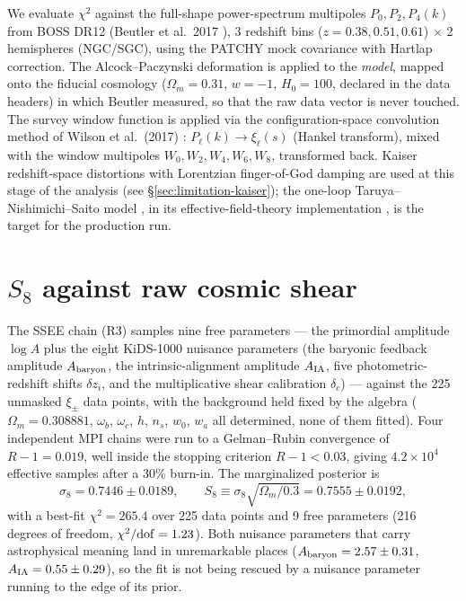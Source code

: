 \documentclass[12pt,a4paper]{article}
\newcommand{\SSEE}{\textsc{SSEE}}
\begin{document}
We evaluate $\chi^2$ against the full-shape power-spectrum multipoles
$P_0,P_2,P_4(k)$ from BOSS DR12 (Beutler et al.~2017 \citep{Beutler2017}), 3 redshift bins
($z=0.38,0.51,0.61$) $\times$ 2 hemispheres (NGC/SGC), using the PATCHY mock
covariance with Hartlap correction. The Alcock--Paczynski deformation is
applied to the \emph{model}, mapped onto the fiducial cosmology
($\Omega_m=0.31$, $w=-1$, $H_0=100$, declared in the data headers) in which
Beutler measured, so that the raw data vector is never touched. The survey
window function is applied via the configuration-space convolution method of
Wilson et al.~(2017) \citep{Wilson2017}: $P_\ell(k)\to\xi_\ell(s)$ (Hankel transform),
mixed with the window multipoles $W_0,W_2,W_4,W_6,W_8$, transformed back.
Kaiser redshift-space distortions with Lorentzian finger-of-God damping are
used at this stage of the analysis (see \S\ref{sec:limitation-kaiser}); the
one-loop Taruya--Nishimichi--Saito model \citep{Taruya2010}, in its
effective-field-theory implementation \citep{Baumann2012,ChenVlahWhite2020},
is the target for the production run.

\section{$S_8$ against raw cosmic shear}
\label{sec:s8}

The \SSEE{} chain (R3) samples nine free parameters --- the primordial
amplitude $\log A$ plus the eight KiDS-1000 nuisance parameters (the baryonic
feedback amplitude $A_{\rm baryon}$, the intrinsic-alignment amplitude
$A_{\rm IA}$, five photometric-redshift shifts $\delta z_i$, and the
multiplicative shear calibration $\delta_c$) --- against the 225 unmasked
$\xi_\pm$ data points, with the background held fixed by the algebra
($\Omega_m=0.308881$, $\omega_b$, $\omega_c$, $h$, $n_s$, $w_0$, $w_a$ all
determined, none of them fitted). Four independent MPI chains were run to a
Gelman--Rubin convergence of $R-1=0.019$, well inside the stopping criterion
$R-1<0.03$, giving $4.2\times10^4$ effective samples after a 30\% burn-in.
The marginalized posterior is
\begin{equation}
\sigma_8 = 0.7446\pm0.0189, \qquad
S_8 \equiv \sigma_8\sqrt{\Omega_m/0.3} = 0.7555\pm0.0192,
\end{equation}
with a best-fit $\chi^2=265.4$ over 225 data points and 9 free parameters
(216 degrees of freedom, $\chi^2/{\rm dof}=1.23$). Both nuisance parameters
that carry astrophysical meaning land in unremarkable places
($A_{\rm baryon}=2.57\pm0.31$, $A_{\rm IA}=0.55\pm0.29$), so the fit is not
being rescued by a nuisance parameter running to the edge of its prior.
\end{document}
